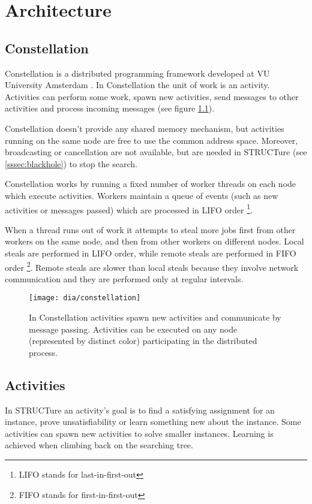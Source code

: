 \chapter{Architecture}

\section{Constellation}

Constellation is a distributed programming framework developed at VU University
Amsterdam \cite{mine:constellation}. In Constellation the unit of work is
an activity. Activities can perform some work, spawn new activities,
send messages to other activities and process incoming messages
(see figure \ref{fig:constellation}).

Constellation doesn't provide any shared memory mechanism, but
activities running on the same node are free to use the common
address space. Moreover, broadcasting or cancellation are not
available, but are needed in STRUCTure (see \ref{sssec:blackhole})
to stop the search.

Constellation works by running a fixed number of worker threads
on each node which execute activities.  Workers maintain a
queue of events (such as new activities or messages passed) which are
processed in LIFO order \footnote{LIFO stands for last-in-first-out}.

When a thread runs out of work it attempts to steal more
jobs first from other workers on the same node, and then from
other workers on different nodes.  Local steals are performed
in LIFO order, while remote steals are performed in FIFO order
\footnote{FIFO stands for first-in-first-out}. Remote steals are
slower than local steals because they involve network communication
and they are performed only at regular intervals.

\begin{figure}
  \centering
  \texttt{[image: dia/constellation]}
  \caption{In Constellation activities spawn new
  activities and communicate by message passing.
  Activities can be executed on any node (represented by
  distinct color) participating in the distributed process.}
  \label{fig:constellation}
\end{figure}


\section{Activities}

In STRUCTure an activity's goal is to find a satisfying assignment
for an instance, prove unsatisfiability or learn something new
about the instance. Some activities can spawn new activities to
solve smaller instances.  Learning is achieved when climbing back
on the searching tree.

